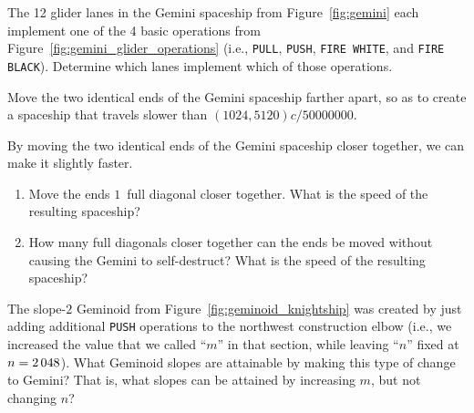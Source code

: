 \begin{multicols}{2}
	
	\mfilbreak
	
	
	\begin{problem}\label{exer:gemini_which_lane_operations} 
		The 12 glider lanes in the Gemini spaceship from Figure~\ref{fig:gemini} each implement one of the 4 basic operations from Figure~\ref{fig:gemini_glider_operations} (i.e., \texttt{PULL}, \texttt{PUSH}, \texttt{FIRE WHITE}, and \texttt{FIRE BLACK}). Determine which lanes implement which of those operations.
	\end{problem}
	
	
	\mfilbreak
	
	
	\begin{problem}\label{exer:gemini_separate_ends_slow} 
		Move the two identical ends of the Gemini spaceship farther apart, so as to create a spaceship that travels slower than $(1024,5120)c/50000000$.
	\end{problem}
	
	
	\mfilbreak
	
	
	\begin{problemstar}\label{exer:squeeze_gemini_how_far} 
		By moving the two identical ends of the Gemini spaceship closer together, we can make it slightly faster.\smallskip
		
		\begin{enumerate}[label=\bf\color{ocre}(\alph*)]
			\item Move the ends $1$~full diagonal closer together. What is the speed of the resulting spaceship?
			
			\item How many full diagonals closer together can the ends be moved without causing the Gemini to self-destruct? What is the speed of the resulting spaceship?
		\end{enumerate}
	\end{problemstar}
	
	
	\mfilbreak
	
	
	\begin{problemstar}\label{exer:gemini_slope_n_fixed} 
		The slope-$2$ Geminoid from Figure~\ref{fig:geminoid_knightship} was created by just adding additional \texttt{PUSH} operations to the northwest construction elbow (i.e., we increased the value that we called ``$m$'' in that section, while leaving ``$n$'' fixed at $n = 2{\,}048$). What Geminoid slopes are attainable by making this type of change to Gemini? That is, what slopes can be attained by increasing $m$, but not changing $n$?
	\end{problemstar}
	

\end{multicols}
